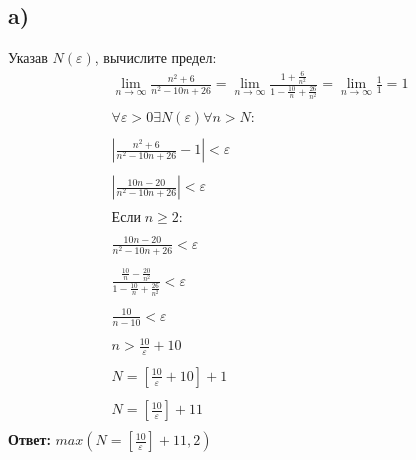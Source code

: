 \documentclass[a4paper,12pt]{article}
\begin{document}
\subsection*{a) }
Указав $ N(\varepsilon) $, вычислите предел:
\begin{equation*}
\begin{gathered}
\lim_{n\to\infty} \frac{n^2+6}{n^2-10n+26} =
\lim_{n\to\infty} \frac{1+\frac{6}{n^2}}{1-\frac{10}{n}+\frac{26}{n^2}}=
\lim_{n\to\infty} \frac{1}{1} = 1\\\\
\forall \varepsilon > 0  \exists N(\varepsilon) \forall n > N:\\\\
|\frac{n^2+6}{n^2-10n+26} -1 | < \varepsilon\\\\
|\frac{10n-20}{n^2-10n+26}| < \varepsilon\\\\
Если \; n \geq 2:\\\\
\frac{10n-20}{n^2-10n+26} < \varepsilon\\\\
\frac{\frac{10}{n}-\frac{20}{n^2}}{1 -\frac{10}{n} +\frac{26}{n^2}} <\varepsilon\\\\
\frac{10}{n-10} < \varepsilon\\\\
n > \frac{10}{\varepsilon} + 10\\\\
N = \left[\frac{10}{\varepsilon}+10\right]+ 1\\\\
N = \left[\frac{10}{\varepsilon}\right]+ 11\\
\end{gathered}
\end{equation*}
{\Large \textbf{Ответ:}\; $max(N = \left[\frac{10}{\varepsilon}\right]+ 11, 2)$}
\end{document}

